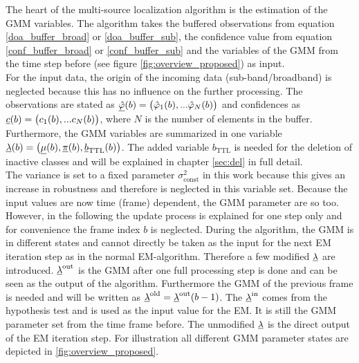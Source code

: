 
The heart of the multi-source localization algorithm is the estimation of the \ac{GMM} variables. The algorithm takes the buffered observations from equation \ref{doa_buffer_broad}  or \ref{doa_buffer_sub}, the confidence value from equation \ref{conf_buffer_broad} or \ref{conf_buffer_sub} and the variables of the \ac{GMM} from the time step before (see figure \ref{fig:overview_proposed}) as input. \\
For the input data, the origin of the incoming data (sub-band/broadband) is neglected because this has no influence on the further processing. The observations are stated as $\underline{\hat{\varphi}}(b) = \big(\hat{\varphi}_1(b), ... \hat{\varphi}_{N}(b)\big)$ and confidences as $\underline{c}(b) = \big(c_1(b), ... c_N(b)\big)$, where $N$ is the number of elements in the buffer. Furthermore, the \ac{GMM} variables are summarized in one variable $\underline{\lambda}(b) = \big(\underline{\mu}(b), \underline{\pi}(b), \underline{b}_\text{TTL}(b)\big)$. The added variable $b_\text{TTL}$ is needed for the deletion of inactive classes and will be explained in chapter \ref{sec:del} in full detail. \\
The variance is set to a fixed parameter $\sigma^2_\text{const}$ in this work because this gives an increase in robustness and therefore is neglected in this variable set. Because the input values are now time (frame) dependent, the \ac{GMM} parameter are so too. However, in the following the update process is explained for one step only and for convenience the frame index $b$ is neglected. During the algorithm, the \ac{GMM} is in different states and cannot directly be taken as the input for the next \ac{EM} iteration step as in the normal \ac{EM}-algorithm. Therefore a few modified $\underline{\lambda}$ are introduced. $\underline{\lambda}^\text{out}$ is the \ac{GMM} after one full processing step is done and can be seen as the output of the algorithm. Furthermore the \ac{GMM} of the previous frame is needed and will be written as $\underline{\lambda}^\text{old} = \underline{\lambda}^\text{out}(b-1)$.
The $\underline{\lambda}^\text{in}$ comes from the hypothesis test and is used as the input value for the \ac{EM}. It is still the \ac{GMM} parameter set from the time frame before. The unmodified $\underline{\lambda}$ is the direct output of the EM iteration step. For illustration all different \ac{GMM} parameter states are depicted in \ref{fig:overview_proposed}.\\
